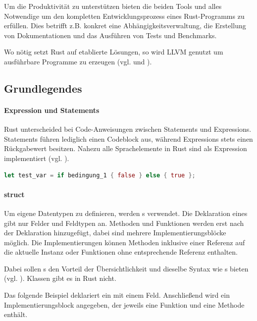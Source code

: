 \documentclass[11pt,a4paper, ngerman]{article}
\begin{document}
Um die Produktivität zu unterstützen bieten die beiden Tools  und  alles Notwendige um den kompletten Entwicklungsprozess eines Rust-Programms zu erfüllen. Dies betrifft z.B. konkret eine Abhängigkeitsverwaltung, die Erstellung von Dokumentationen und das Ausführen von Tests und Benchmarks.

Wo nötig setzt Rust auf etablierte Lösungen, so wird LLVM genutzt um ausführbare Programme zu erzeugen (vgl. \cite{RustcCodegen2} und \cite{RustcCodegen}).

\subsection{Grundlegendes}
\paragraph{Expression und Statements} Rust unterscheided bei Code-Anweisungen zwischen Statements und Expressions. Statements führen lediglich einen Codeblock aus, während Expressions stets einen Rückgabewert besitzen. Nahezu alle Sprachelemente in Rust sind als Expression implementiert (vgl. \cite[S. 122 ff.]{BO18}).

\begin{lstlisting}[language=rust, caption={Expression Einführendes Beispiel:}]
    let test_var = if bedingung_1 { false } else { true };
\end{lstlisting}

\paragraph{struct} Um eigene Datentypen zu definieren, werden s verwendet. Die Deklaration eines  gibt nur Felder und Feldtypen an. Methoden und Funktionen werden erst nach der Deklaration hinzugefügt, dabei sind mehrere Implementierungsblöcke möglich. Die Implementierungen können Methoden inklusive einer Referenz auf die aktuelle Instanz oder Funktionen ohne entsprechende Referenz enthalten.

Dabei sollen s den Vorteil der Übersichtlichkeit und dieselbe Syntax wie s bieten (vgl. \cite[S. 91]{BO18}). Klassen gibt es in Rust nicht.

Das folgende Beispiel deklariert ein  mit einem Feld. Anschließend wird ein Implementierungsblock angegeben, der jeweils eine Funktion und eine Methode enthält.
\end{document}
